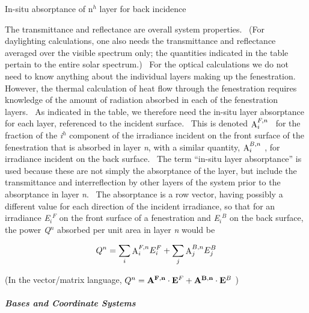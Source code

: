 In-situ absorptance of n\(^{h}\) layer for back incidence

The transmittance and reflectance are overall system properties.~ (For daylighting calculations, one also needs the transmittance and reflectance averaged over the visible spectrum only; the quantities indicated in the table pertain to the entire solar spectrum.)~ For the optical calculations we do not need to know anything about the individual layers making up the fenestration.~ However, the thermal calculation of heat flow through the fenestration requires knowledge of the amount of radiation absorbed in each of the fenestration layers.~ As indicated in the table, we therefore need the in-situ layer absorptance for each layer, referenced to the incident surface.~ This is denoted \({\mathop{\rm A}\nolimits}_i^{F,n}\) ~for the fraction of the \emph{i\(^{h}\)} component of the irradiance incident on the front surface of the fenestration that is absorbed in layer \emph{n}, with a similar quantity, \({\mathop{\rm A}\nolimits}_i^{B,n}\) , for irradiance incident on the back surface.~ The term ``in-situ layer absorptance'' is used because these are not simply the absorptance of the layer, but include the transmittance and interreflection by other layers of the system prior to the absorptance in layer \emph{n}.~ The absorptance is a row vector, having possibly a different value for each direction of the incident irradiance, so that for an irradiance \emph{E\(_{i}\)\(^{F}\)} on the front surface of a fenestration and \emph{E\(_{i}\)\(^{B}\)} on the back surface, the power \emph{Q\(^{n}\)} absorbed per unit area in layer \emph{n} would be

\begin{equation}
{Q^n} = \sum\limits_i {{\mathop{\rm A}\nolimits}_i^{F,n}E_i^F}  + \sum\limits_j {{\mathop{\rm A}\nolimits}_j^{B,n}E_j^B}
\end{equation}

(In the vector/matrix language, \({Q^n} = {\bf{A}^{F,n}} \cdot {{\bf{E}}^F} + {\bf{A}^{B,n}} \cdot {{\bf{E}}^B}\) )

\subparagraph{Bases and Coordinate Systems}\label{bases-and-coordinate-systems}

